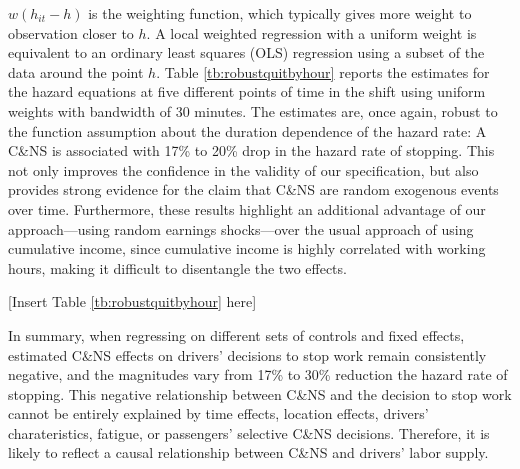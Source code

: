 \documentclass[reviewmode,AEJ]{AEA}
\begin{document}
$w(h_{it}-h)$ is the weighting function, which typically gives more weight to observation closer to $h$. A local weighted regression with a uniform weight is equivalent to an ordinary least squares (OLS) regression using a subset of the data around the point $h$. Table \ref{tb:robustquitbyhour} reports the estimates for the hazard equations at five different points of time in the shift using uniform weights with bandwidth of 30 minutes. The estimates are, once again, robust to the function assumption about the duration dependence of the hazard rate: A C\&NS is associated with 17\% to 20\% drop in the hazard rate of stopping.  This not only improves the confidence in the validity of our specification, but also provides strong evidence for the claim that C\&NS are random exogenous events over time. Furthermore, these results highlight an additional advantage of our approach---using random earnings 
shocks---over the usual approach of using cumulative income, since cumulative income is highly correlated
with working hours, making it difficult to disentangle the two effects.  



\begin{center}
	[Insert Table \ref{tb:robustquitbyhour} here]
\end{center}


In summary, when regressing on different sets of controls and fixed effects, estimated C\&NS effects on
drivers' decisions to stop work remain consistently negative, and the magnitudes vary
from 17\% to 30\% reduction the hazard rate of stopping. This negative relationship between C\&NS and the decision to stop work cannot
be entirely explained by time effects, location effects, drivers' charateristics, fatigue, or passengers' 
selective C\&NS decisions. Therefore, it is likely to reflect a causal relationship between C\&NS and 
drivers' labor supply.
\end{document}
